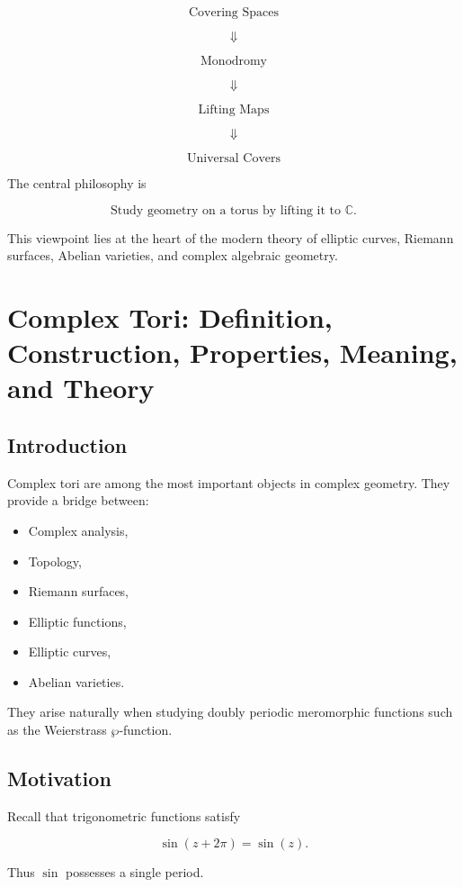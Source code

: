 \documentclass[12pt,a4paper]{article}
\theoremstyle{notespace}
\begin{document}
\[
\boxed{\text{Covering Spaces}}
\]

\[
\Downarrow
\]

\[
\boxed{\text{Monodromy}}
\]

\[
\Downarrow
\]

\[
\boxed{\text{Lifting Maps}}
\]

\[
\Downarrow
\]

\[
\boxed{\text{Universal Covers}}
\]

The central philosophy is

\[
\boxed{
	\text{Study geometry on a torus by lifting it to } \mathbb C.
}
\]

This viewpoint lies at the heart of the modern theory of elliptic curves, Riemann surfaces, Abelian varieties, and complex algebraic geometry.

\section{Complex Tori: Definition, Construction, Properties, Meaning, and Theory}

\subsection{Introduction}

Complex tori are among the most important objects in complex geometry. They provide a bridge between:

\begin{itemize}
	\item Complex analysis,
	\item Topology,
	\item Riemann surfaces,
	\item Elliptic functions,
	\item Elliptic curves,
	\item Abelian varieties.
\end{itemize}

They arise naturally when studying doubly periodic meromorphic functions such as the Weierstrass \(\wp\)-function.

\subsection{Motivation}

Recall that trigonometric functions satisfy

\[
\sin(z+2\pi)=\sin(z).
\]

Thus \(\sin\) possesses a single period.
\end{document}
